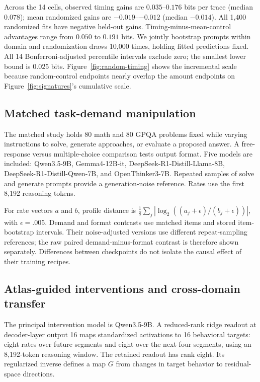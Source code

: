 Across the 14 cells, observed timing gains are $0.035$--$0.176$ bits per trace (median $0.078$); mean randomized gains are $-0.019$--$-0.012$ (median $-0.014$). All 1,400 randomized fits have negative held-out gains. Timing-minus-mean-control advantages range from $0.050$ to $0.191$ bits. We jointly bootstrap prompts within domain and randomization draws 10,000 times, holding fitted predictions fixed. All 14 Bonferroni-adjusted percentile intervals exclude zero; the smallest lower bound is $0.025$ bits. Figure~\ref{fig:random-timing} shows the incremental scale because random-control endpoints nearly overlap the amount endpoints on Figure~\ref{fig:signatures}'s cumulative scale.

\subsection{Matched task-demand manipulation}
The matched study holds 80 math and 80 GPQA problems fixed while varying instructions to solve, generate approaches, or evaluate a proposed answer. A free-response versus multiple-choice comparison tests output format. Five models are included: Qwen3.5-9B, Gemma4-12B-it, DeepSeek-R1-Distill-Llama-8B, DeepSeek-R1-Distill-Qwen-7B, and OpenThinker3-7B. Repeated samples of solve and generate prompts provide a generation-noise reference. Rates use the first 8,192 reasoning tokens.

For rate vectors $a$ and $b$, profile distance is $\frac18\sum_j|\log_2((a_j+\epsilon)/(b_j+\epsilon))|$, with $\epsilon=.005$. Demand and format contrasts use matched items and stored item-bootstrap intervals. Their noise-adjusted versions use different repeat-sampling references; the raw paired demand-minus-format contrast is therefore shown separately. Differences between checkpoints do not isolate the causal effect of their training recipes.

\subsection{Atlas-guided interventions and cross-domain transfer}
The principal intervention model is Qwen3.5-9B. A reduced-rank ridge readout at decoder-layer output 16 maps standardized activations to 16 behavioral targets: eight rates over future segments and eight over the next four segments, using an 8,192-token reasoning window. The retained readout has rank eight. Its regularized inverse defines a map $G$ from changes in target behavior to residual-space directions.

